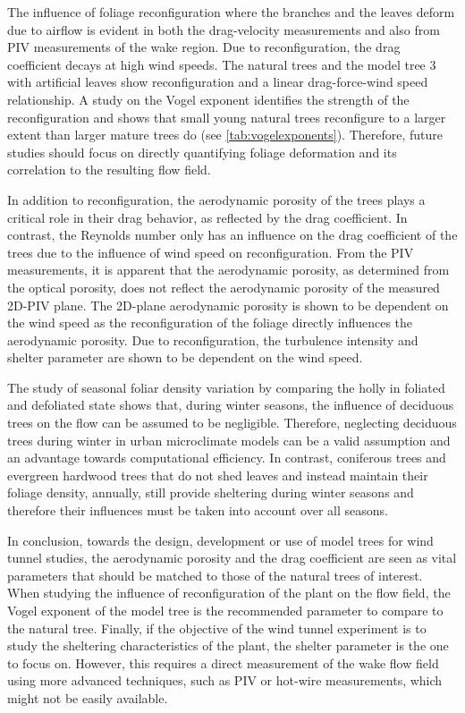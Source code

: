 The influence of foliage reconfiguration where the branches and the leaves deform due to airflow is evident in both the drag-velocity measurements and also from PIV measurements of the wake region. Due to reconfiguration, the drag coefficient decays at high wind speeds. The natural trees and the model tree 3 with artificial leaves show reconfiguration and a linear drag-force-wind speed relationship. A study on the Vogel exponent identifies the strength of the reconfiguration and shows that small young natural trees reconfigure to a larger extent than larger mature trees do (see \cref{tab:vogelexponents}). Therefore, future studies should focus on directly quantifying foliage deformation and its correlation to the resulting flow field.

In addition to reconfiguration, the aerodynamic porosity of the trees plays a critical role in their drag behavior, as reflected by the drag coefficient. In contrast, the Reynolds number only has an influence on the drag coefficient of the trees due to the influence of wind speed on reconfiguration. From the PIV measurements, it is apparent that the aerodynamic porosity, as determined from the optical porosity, does not reflect the aerodynamic porosity of the measured 2D-PIV plane. The 2D-plane aerodynamic porosity is shown to be dependent on the wind speed as the reconfiguration of the foliage directly influences the aerodynamic porosity. Due to reconfiguration, the turbulence intensity and shelter parameter are shown to be dependent on the wind speed.

The study of seasonal foliar density variation by comparing the holly in foliated and defoliated state shows that, during winter seasons, the influence of deciduous trees on the flow can be assumed to be negligible. Therefore, neglecting deciduous trees during winter in urban microclimate models can be a valid assumption and an advantage towards computational efficiency. In contrast, coniferous trees and evergreen hardwood trees that do not shed leaves and instead maintain their foliage density, annually, still provide sheltering during winter seasons and therefore their influences must be taken into account over all seasons.

In conclusion, towards the design, development or use of model trees for wind tunnel studies, the aerodynamic porosity and the drag coefficient are seen as vital parameters that should be matched to those of the natural trees of interest. When studying the influence of reconfiguration of the plant on the flow field, the Vogel exponent of the model tree is the recommended parameter to compare to the natural tree. Finally, if the objective of the wind tunnel experiment is to study the sheltering characteristics of the plant, the shelter parameter is the one to focus on. However, this requires a direct measurement of the wake flow field using more advanced techniques, such as PIV or hot-wire measurements, which might not be easily available.

